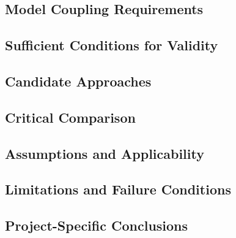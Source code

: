 \subsection{Model Coupling Requirements}
\label{sec:res-mod-src-model-coupling-requirements}


\subsection{Sufficient Conditions for Validity}
\label{sec:res-mod-src-sufficient-conditions-validity}


\subsection{Candidate Approaches}
\label{sec:res-mod-src-candidate-approaches}


\subsection{Critical Comparison}
\label{sec:res-mod-src-critical-comparison}


\subsection{Assumptions and Applicability}
\label{sec:res-mod-src-assumptions}


\subsection{Limitations and Failure Conditions}
\label{sec:res-mod-src-limitations}


\subsection{Project-Specific Conclusions}
\label{sec:res-mod-src-conclusions}

